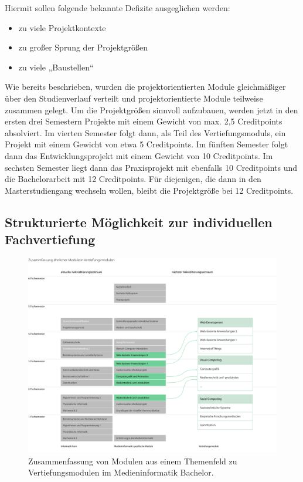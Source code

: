 Hiermit sollen folgende bekannte Defizite ausgeglichen werden:

\begin{itemize}
\tightlist
\item
  zu viele Projektkontexte
\item
  zu großer Sprung der Projektgrößen
\item
  zu viele „Baustellen``
\end{itemize}

Wie bereits beschrieben, wurden die projektorientierten Module
gleichmäßiger über den Studienverlauf verteilt und projektorientierte
Module teilweise zusammen gelegt. Um die Projektgrößen sinnvoll
aufzubauen, werden jetzt in den ersten drei Semestern Projekte mit einem
Gewicht von max. 2,5 Creditpoints absolviert. Im vierten Semester folgt
dann, als Teil des Vertiefungsmoduls, ein Projekt mit einem Gewicht von
etwa 5 Creditpoints. Im fünften Semester folgt dann das
Entwicklungsprojekt mit einem Gewicht von 10 Creditpoints. Im sechsten
Semester liegt dann das Praxisprojekt mit ebenfalls 10 Creditpoints und
die Bachelorarbeit mit 12 Creditpoints. Für diejenigen, die dann in den
Masterstudiengang wechseln wollen, bleibt die Projektgröße bei 12
Creditpoints.

\subsection{Strukturierte Möglichkeit zur individuellen
Fachvertiefung}\label{strukturierte-muxf6glichkeit-zur-individuellen-fachvertiefung}

\begin{figure}[htbp]
\centering
\includegraphics[width=\columnwidth]{../anhaenge/bilder/ba-vertiefungen.png}
\caption{Zusammenfassung von Modulen aus einem Themenfeld zu
Vertiefungsmodulen im Medieninformatik Bachelor.}
\end{figure}

